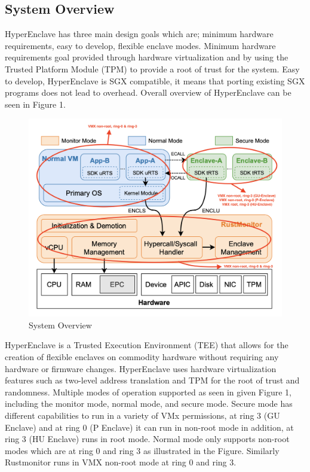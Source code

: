 \subsection{System Overview}
HyperEnclave has three main design goals which are; minimum hardware requirements, easy to develop, flexible enclave modes. Minimum hardware requirements goal provided through hardware virtualization and by using the Trusted Platform Module (TPM) to provide a root of trust for the system. Easy to develop, HyperEnclave is SGX compatible, it means that porting existing SGX programs does not lead to overhead.
\newline
Overall overview of HyperEnclave can be seen in Figure 1. 
\begin{figure}[H]
    \centerline{\includegraphics[scale=.42]{figures/system_overview.png}}
    \caption{System Overview}
    \label{fig}
\end{figure}

HyperEnclave is a Trusted Execution Environment (TEE) that allows for the creation of flexible enclaves on commodity hardware without requiring any hardware or firmware changes. HyperEnclave uses hardware virtualization features such as two-level address translation and TPM for the root of trust and randomness.
Multiple modes of operation supported as seen in given Figure 1, including the monitor mode, normal mode, and secure mode. Secure mode has different capabilities to run in a variety of VMx permissions, at ring 3 (GU Enclave) and at ring 0 (P Enclave) it can run in non-root mode in addition, at ring 3 (HU Enclave) runs in root mode. Normal mode only supports non-root modes which are at ring 0 and ring 3 as illustrated in the Figure. Similarly Rustmonitor runs in VMX non-root mode at ring 0 and ring 3. 

